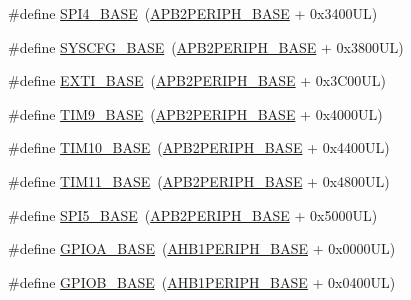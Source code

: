 \begin{DoxyCompactItemize}
\item 
\#define \hyperlink{group___peripheral__memory__map_gac5cfaedf263cee1e79554665f921c708}{S\+P\+I4\+\_\+\+B\+A\+SE}~(\hyperlink{group___peripheral__memory__map_ga25b99d6065f1c8f751e78f43ade652cb}{A\+P\+B2\+P\+E\+R\+I\+P\+H\+\_\+\+B\+A\+SE} + 0x3400\+U\+L)
\item 
\#define \hyperlink{group___peripheral__memory__map_ga62246020bf3b34b6a4d8d0e84ec79d3d}{S\+Y\+S\+C\+F\+G\+\_\+\+B\+A\+SE}~(\hyperlink{group___peripheral__memory__map_ga25b99d6065f1c8f751e78f43ade652cb}{A\+P\+B2\+P\+E\+R\+I\+P\+H\+\_\+\+B\+A\+SE} + 0x3800\+U\+L)
\item 
\#define \hyperlink{group___peripheral__memory__map_ga87371508b3bcdcd98cd1ec629be29061}{E\+X\+T\+I\+\_\+\+B\+A\+SE}~(\hyperlink{group___peripheral__memory__map_ga25b99d6065f1c8f751e78f43ade652cb}{A\+P\+B2\+P\+E\+R\+I\+P\+H\+\_\+\+B\+A\+SE} + 0x3\+C00\+U\+L)
\item 
\#define \hyperlink{group___peripheral__memory__map_ga92ae902be7902560939223dd765ece08}{T\+I\+M9\+\_\+\+B\+A\+SE}~(\hyperlink{group___peripheral__memory__map_ga25b99d6065f1c8f751e78f43ade652cb}{A\+P\+B2\+P\+E\+R\+I\+P\+H\+\_\+\+B\+A\+SE} + 0x4000\+U\+L)
\item 
\#define \hyperlink{group___peripheral__memory__map_ga3eff32f3801db31fb4b61d5618cad54a}{T\+I\+M10\+\_\+\+B\+A\+SE}~(\hyperlink{group___peripheral__memory__map_ga25b99d6065f1c8f751e78f43ade652cb}{A\+P\+B2\+P\+E\+R\+I\+P\+H\+\_\+\+B\+A\+SE} + 0x4400\+U\+L)
\item 
\#define \hyperlink{group___peripheral__memory__map_ga3a4a06bb84c703084f0509e105ffaf1d}{T\+I\+M11\+\_\+\+B\+A\+SE}~(\hyperlink{group___peripheral__memory__map_ga25b99d6065f1c8f751e78f43ade652cb}{A\+P\+B2\+P\+E\+R\+I\+P\+H\+\_\+\+B\+A\+SE} + 0x4800\+U\+L)
\item 
\#define \hyperlink{group___peripheral__memory__map_gac1c58d33414e167d478ecd0e31331dfa}{S\+P\+I5\+\_\+\+B\+A\+SE}~(\hyperlink{group___peripheral__memory__map_ga25b99d6065f1c8f751e78f43ade652cb}{A\+P\+B2\+P\+E\+R\+I\+P\+H\+\_\+\+B\+A\+SE} + 0x5000\+U\+L)
\item 
\#define \hyperlink{group___peripheral__memory__map_gad7723846cc5db8e43a44d78cf21f6efa}{G\+P\+I\+O\+A\+\_\+\+B\+A\+SE}~(\hyperlink{group___peripheral__memory__map_ga811a9a4ca17f0a50354a9169541d56c4}{A\+H\+B1\+P\+E\+R\+I\+P\+H\+\_\+\+B\+A\+SE} + 0x0000\+U\+L)
\item 
\#define \hyperlink{group___peripheral__memory__map_gac944a89eb789000ece920c0f89cb6a68}{G\+P\+I\+O\+B\+\_\+\+B\+A\+SE}~(\hyperlink{group___peripheral__memory__map_ga811a9a4ca17f0a50354a9169541d56c4}{A\+H\+B1\+P\+E\+R\+I\+P\+H\+\_\+\+B\+A\+SE} + 0x0400\+U\+L)

\end{DoxyCompactItemize}
